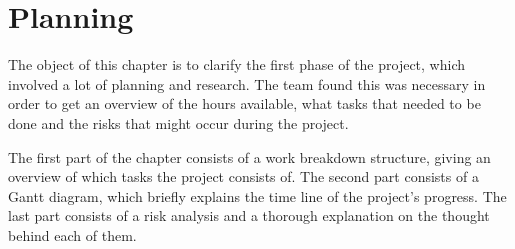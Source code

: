 \chapter{Planning}

The object of this chapter is to clarify the first phase of the project, which involved a lot of planning and research. The team found this was necessary in order to get an overview of the hours available, what tasks that needed to be done and the risks that might occur during the project.

The first part of the chapter consists of a work breakdown structure, giving an overview of which tasks the project consists of. The second part consists of a Gantt diagram, which briefly explains the time line of the project's progress. The last part consists of a risk analysis and a thorough explanation on the thought behind each of them.


\newpage


\newpage


\newpage

